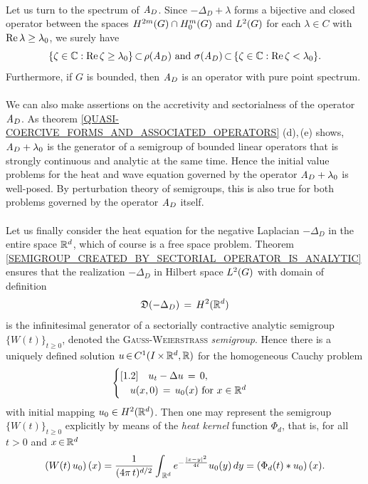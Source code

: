 \documentclass[11pt,twoside]{article}
\def\G{G}
\begin{document}
\paragraph{} %
Let us turn to the spectrum of $\mathit{A}_D$.
Since $-\Delta_D + \lambda$ forms a bijective and closed operator
between the spaces $H^{2m}(\G) \cap \HN{m}{\G}$ and $\Lh$
for each $\lambda \in C$ with $\operatorname{Re} \lambda \geq \lambda_0$,
we surely have
\[
\{ \zeta \in {\mathbb{C}}: \operatorname{Re} \zeta \geq \lambda_0\} {\,\subset\,} \rho(\mathit{A}_D)
\mbox{ and }
\sigma(\mathit{A}_D) {\,\subset\,} \{ \zeta \in {\mathbb{C}}: \operatorname{Re} \zeta < \lambda_0\}.
\]
Furthermore,
if $\G$ is bounded,
then $\mathit{A}_D$ is an operator with pure point spectrum.

\paragraph{} %
We can also make assertions on the accretivity and sectorialness
of the operator $\mathit{A}_D$.
As theorem \eqref{QUASI-COERCIVE_FORMS_AND_ASSOCIATED_OPERATORS}
(d),\,(e) shows,
$\mathit{A}_D + \lambda_0$ is the generator
of a semigroup of bounded linear operators
that is strongly continuous and analytic at the same time.
Hence the initial value problems for the heat and wave equation
governed by the operator $\mathit{A}_D + \lambda_0$ is well-posed.
By perturbation theory of semigroups,
this is also true for both problems governed by the operator $\mathit{A}_D$ itself.

\paragraph{} %
Let us finally consider the heat equation
for the negative Laplacian $-\Delta_D$ in the entire space ${\mathbb{R}}^d$,
which of course is a free space problem.
Theorem \ref{SEMIGROUP_CREATED_BY_SECTORIAL_OPERATOR_IS_ANALYTIC} ensures
that the realization $-\Delta_D$ in Hilbert space $\Lh$
with domain of definition
\[
\mathfrak{D}(-\Delta_D) \,=\, H^2({\mathbb{R}}^d)
\]
is the infinitesimal generator
of a sectorially contractive analytic semigroup $\{W(t)\}_{t \geq 0}$,
denoted the \textsc{Gauss-Weierstrass} \textit{semigroup}.
Hence there is a uniquely defined solution $u {\,\in\,} C^1(I {\,\times\,} {\mathbb{R}}^d,{\mathbb{R}})$
for the homogeneous Cauchy problem
\[
\begin{cases}[1.2]
\quad u_t - \Delta u \,=\, 0,\\
\quad u(x,0)         \,=\, u_0(x) \mbox{ for } x \in {\mathbb{R}}^d \\
\end{cases}
\]
with initial mapping $u_0 \in H^2({\mathbb{R}}^d)$.
Then one may represent the semigroup $\{W(t)\}_{t \geq 0}$
explicitly by means of the \textit{heat kernel} function $\Phi_d$,
that is,
for all $t > 0$ and $x {\,\in\,} {\mathbb{R}}^d$
\[
(W(t) \, u_0) \, (x)
=
\frac{1}{(4 \pi \, t)^{d/2}}
\int_{\,\Rd} e^{- \frac{\abs{x-y} ^2}{4t}} u_0(y) \, dy
=
(\Phi_d(t) \ast u_0)\,(x).
\]
\end{document}
